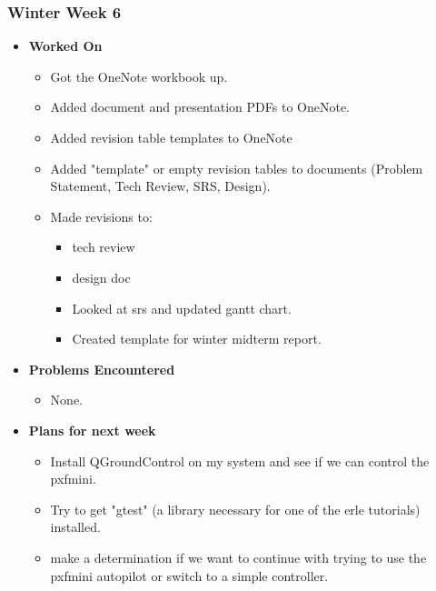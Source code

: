 \documentclass[compsoc,draftclsnofoot,onecolumn,10pt]{IEEEtran}
\begin{document}
\subsubsection{Winter Week 6}
\begin{itemize}
    \item {\textbf{Worked On}}
    \begin{itemize}
        \item Got the OneNote workbook up.
        \item Added document and presentation PDFs to OneNote.
        \item Added revision table templates to OneNote
        \item Added "template" or empty revision tables to documents (Problem Statement, Tech Review, SRS, Design).
        \item Made revisions to:
        \begin{itemize}
            \item tech review
            \item design doc
            \item Looked at srs and updated gantt chart.
            \item Created template for winter midterm report.
        \end{itemize}
    \end{itemize}

    \item {\textbf{Problems Encountered}}
    \begin{itemize}
        \item None.
    \end{itemize}

    \item{\textbf{Plans for next week}}
    \begin{itemize}
        \item Install QGroundControl on my system and see if we can control the pxfmini.
        \item Try to get "gtest" (a library necessary for one of the erle tutorials) installed.
        \item make a determination if we want to continue with trying to use the pxfmini autopilot or switch to a simple controller.
    \end{itemize}
\end{itemize}
\end{document}
